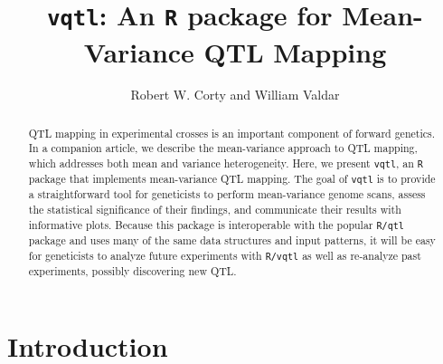 \documentclass{article}
\title{\texttt{vqtl}: An \texttt{R} package for Mean-Variance QTL Mapping}
\author{Robert W. Corty and William Valdar}
\begin{document}
\maketitle


\begin{abstract}
QTL mapping in experimental crosses is an important component of forward genetics.
In a companion article, we describe the mean-variance approach to QTL mapping, which addresses both mean and variance heterogeneity.
Here, we present \texttt{vqtl}, an \texttt{R} package that implements mean-variance QTL mapping.
The goal of \texttt{vqtl} is to provide a straightforward tool for geneticists to perform mean-variance genome scans, assess the statistical significance of their findings, and communicate their results with informative plots.
Because this package is interoperable with the popular \texttt{R/qtl} package and uses many of the same data structures and input patterns, it will be easy for geneticists to analyze future experiments with \texttt{R/vqtl} as well as re-analyze past experiments, possibly discovering new QTL.
\end{abstract}



\section*{Introduction}
\end{document}
